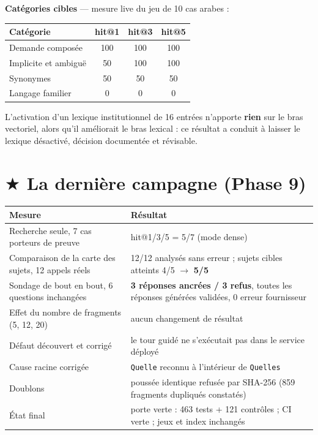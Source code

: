 \documentclass[a4paper,12pt]{report}
\begin{document}
\textbf{Catégories cibles} — mesure live du jeu de 10 cas arabes :

\begin{table}[H]
\centering
\small
\begin{tabular}{lccc}
\toprule
\textbf{Catégorie} & \textbf{hit@1} & \textbf{hit@3} & \textbf{hit@5} \\
\midrule
Demande composée & 100 & 100 & 100 \\
Implicite et ambiguë & 50 & 100 & 100 \\
Synonymes & 50 & 50 & 50 \\
Langage familier & 0 & 0 & 0 \\
\bottomrule
\end{tabular}
\end{table}

L'activation d'un lexique institutionnel de 16 entrées n'apporte \textbf{rien} sur le bras
vectoriel, alors qu'il améliorait le bras lexical : ce résultat a conduit à laisser le lexique
désactivé, décision documentée et révisable.

\section{\textcolor{genlast}{$\bigstar$ La dernière campagne (Phase 9)}}
\begin{table}[H]
\centering
\small
\begin{tabular}{p{6.2cm}p{8.3cm}}
\toprule
\textbf{Mesure} & \textbf{Résultat} \\
\midrule
Recherche seule, 7 cas porteurs de preuve & hit@1/3/5 = 5/7 (mode dense) \\
Comparaison de la carte des sujets, 12 appels réels & 12/12 analysés sans erreur ; sujets cibles
atteints 4/5 $\rightarrow$ \textbf{5/5} \\
Sondage de bout en bout, 6 questions inchangées & \textbf{3 réponses ancrées / 3 refus}, toutes les
réponses générées validées, 0 erreur fournisseur \\
Effet du nombre de fragments (5, 12, 20) & aucun changement de résultat \\
Défaut découvert et corrigé & le tour guidé ne s'exécutait pas dans le service déployé \\
Cause racine corrigée & \texttt{Quelle} reconnu à l'intérieur de \texttt{Quelles} \\
Doublons & poussée identique refusée par SHA-256 (859 fragments dupliqués constatés) \\
État final & porte verte : 463 tests + 121 contrôles ; CI verte ; jeux et index inchangés \\
\bottomrule
\end{tabular}
\end{table}
\end{document}
